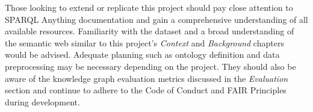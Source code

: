 Those looking to extend or replicate this project should pay close attention to SPARQL Anything \cite{sparqlanythinggithub} documentation and gain a comprehensive understanding of all available resources. Familiarity with the dataset and a broad understanding of the semantic web similar to this project's \textit{Context} and \textit{Background} chapters would be advised. Adequate planning such as ontology definition and data preprocessing may be necessary depending on the project. They should also be aware of the knowledge graph evaluation metrics discussed in the \textit{Evaluation} section and continue to adhere to the Code of Conduct \cite{bcs} and FAIR Principles \cite{fairprinciples} during development. 
